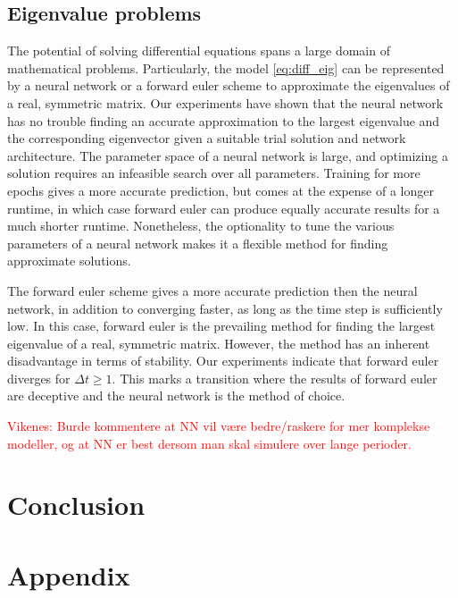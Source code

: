 \documentclass[12pt]{extarticle}
\begin{document}
\subsection*{Eigenvalue problems}
The potential of solving differential equations spans a large domain of mathematical problems. Particularly, the model \eqref{eq:diff_eig} can be represented by a neural network or a forward euler scheme to approximate the eigenvalues of a real, symmetric matrix. Our experiments have shown that the neural network has no trouble finding an accurate approximation to the largest eigenvalue and the corresponding eigenvector given a suitable trial solution and network architecture. The parameter space of a neural network is large, and optimizing a solution requires an infeasible search over all parameters. Training for more epochs gives a more accurate prediction, but comes at the expense of a longer runtime, in which case forward euler can produce equally accurate results for a much shorter runtime. Nonetheless, the optionality to tune the various parameters of a neural network makes it a flexible method for finding approximate solutions.

The forward euler scheme gives a more accurate prediction then the neural network, in addition to converging faster, as long as the time step is sufficiently low. In this case, forward euler is the prevailing method for finding the largest eigenvalue of a real, symmetric matrix. However, the method has an inherent disadvantage in terms of stability. Our experiments indicate that forward euler diverges for $\Delta t \ge 1$. This marks a transition where the results of forward euler are deceptive and the neural network is the method of choice.

\textcolor{red}{Vikenes: Burde kommentere at NN vil være bedre/raskere for mer komplekse modeller, og at NN er best dersom man skal simulere over lange perioder.}



\section{Conclusion}


\section*{Appendix}
\end{document}
